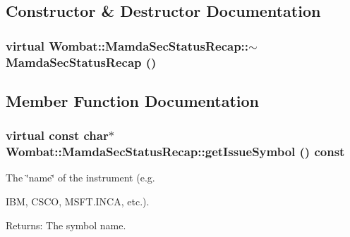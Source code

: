 \subsection{Constructor \& Destructor Documentation}
\hypertarget{classWombat_1_1MamdaSecStatusRecap_339807ec21e46d93961081c71b311b38}{
\subsubsection[$\sim$MamdaSecStatusRecap]{\setlength{\rightskip}{0pt plus 5cm}virtual Wombat::Mamda\-Sec\-Status\-Recap::$\sim$Mamda\-Sec\-Status\-Recap ()}}
\label{classWombat_1_1MamdaSecStatusRecap_339807ec21e46d93961081c71b311b38}




\subsection{Member Function Documentation}
\hypertarget{classWombat_1_1MamdaSecStatusRecap_0ef9120bb02035510e7aea029ac577ba}{
\subsubsection[getIssueSymbol]{\setlength{\rightskip}{0pt plus 5cm}virtual const char$\ast$ Wombat::Mamda\-Sec\-Status\-Recap::get\-Issue\-Symbol () const}}
\label{classWombat_1_1MamdaSecStatusRecap_0ef9120bb02035510e7aea029ac577ba}


The \char`\"{}name\char`\"{} of the instrument (e.g. 

IBM, CSCO, MSFT.INCA, etc.).

\begin{Desc}
\item[Returns:]The symbol name. \end{Desc}


